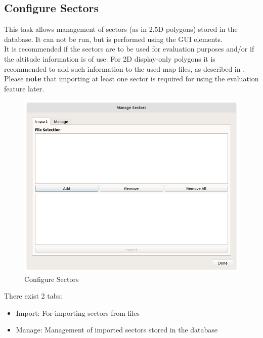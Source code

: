 \subsection{Configure Sectors}
\label{sec:configure_sectors}

This task allows management of sectors (as in 2.5D polygons) stored in the database. It can not be run, but is performed using the GUI elements. \\

It is recommended if the sectors are to be used for evaluation purposes and/or if the altitude information is of use. For 2D display-only polygons it is recommended to add such information to the used map files, as described in . \\

Please \textbf{note} that importing at least one sector is required for using the evaluation feature later.

\begin{figure}[H]
  \center
    \hspace*{-0.5cm}
    \includegraphics[width=15cm]{figures/configure_sectors.png}
  \caption{Configure Sectors}
\end{figure}

There exist 2 tabs:

\begin{itemize}
\item Import: For importing sectors from files
\item Manage: Management of imported sectors stored in the database
\end{itemize}
\ \\

